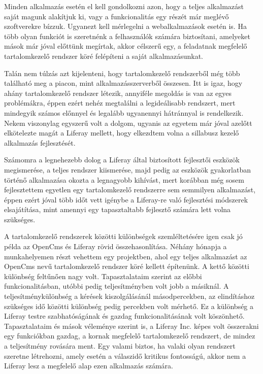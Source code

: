 \documentclass[hidelinks, 12pt, a4paper]{report}
\begin{document}
Minden alkalmazás esetén el kell gondolkozni azon, hogy a teljes alkalmazást saját magunk alakítjuk ki, vagy a funkcionalitás egy részét már meglévő szoftverekre bízzuk. Ugyanezt kell mérlegelni a webalkalmazások esetén is. Ha több olyan funkciót is szeretnénk a felhasználók számára biztosítani, amelyeket mások már jóval előttünk megírtak, akkor célszerű egy, a feladatnak megfelelő tartalomkezelő rendszer köré felépíteni a saját alkalmazásunkat.

Talán nem túlzás azt kijelenteni, hogy tartalomkezelő rendszerből még több található meg a piacon, mint alkalmazásszerverből összesen. Itt is igaz, hogy ahány tartalomkezelő rendszer létezik, annyiféle megoldás is van az egyes problémákra, éppen ezért nehéz megtalálni a legideálisabb rendszert, mert mindegyik számos előnnyel és legalább ugyanennyi hátránnyal is rendelkezik. Nekem viszonylag egyszerű volt a dolgom, ugyanis az egyetem már jóval azelőtt elkötelezte magát a Liferay mellett, hogy elkezdtem volna a sillabusz kezelő alkalmazás fejlesztését.

Számomra a legnehezebb dolog a Liferay által biztosított fejlesztői eszközök megismerése, a teljes rendszer kiismerése, majd pedig az eszközök gyakorlatban történő alkalmazása okozta a legnagyobb kihívást, mert korábban még sosem fejlesztettem egyetlen egy tartalomkezelő rendszerre sem semmilyen alkalmazást, éppen ezért jóval több időt vett igénybe a Liferay-re való fejlesztési módszerek elsajátítása, mint amennyi egy tapasztaltabb fejlesztő számára lett volna szükséges.

A tartalomkezelő rendszerek közötti különbségek szemléltetésére igen csak jó példa az OpenCms és Liferay rövid összehasonlítása. Néhány hónapja a munkahelyemen részt vehettem egy projektben, ahol egy teljes alkalmazást az OpenCms nevű tartalomkezelő rendszer köré kellett építenünk. A kettő közötti különbség feltűnően nagy volt. Tapasztalataim szerint az előbbi funkcionalitásban, utóbbi pedig teljesítményben volt jobb a másiknál. A teljesítménykülönbség a kérések kiszolgálásánál másodpercekben, az elindításhoz szükséges idő közötti különbség pedig percekben volt mérhető. Ez a különbség a Liferay testre szabhatóságának és gazdag funkcionalitásának volt köszönhető. Tapasztalataim és mások véleménye szerint is, a Liferay Inc. képes volt összerakni egy funkciókban gazdag, a kornak megfelelő tartalomkezelő rendszert, de mindez a teljesítmény rovására ment. Egy valami biztos, ha valaki olyan rendszert szeretne létrehozni, amely esetén a válaszidő kritikus fontosságú, akkor nem a Liferay lesz a megfelelő alap ezen alkalmazás számára.
\end{document}

